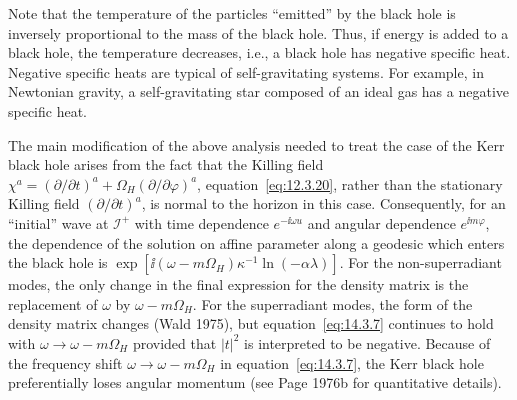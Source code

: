 Note that the temperature of the particles ``emitted'' by the black hole is inversely
proportional to the mass of the black hole. Thus, if energy is added to a black hole,
the temperature decreases, i.e., a black hole has negative specific heat. Negative
specific heats are typical of self-gravitating systems. For example, in Newtonian
gravity, a self-gravitating star composed of an ideal gas has a negative specific heat.

The main modification of the above analysis needed to treat the case of the Kerr
black hole arises from the fact that the Killing field
\(\chi^a=(\partial/\partial t)^a+\Omega_H(\partial/\partial\varphi)^a\),
equation~\eqref{eq:12.3.20}, rather than the stationary Killing field
\((\partial/\partial t)^a\), is normal to the horizon in this case. Consequently, for
an ``initial'' wave at \(\mathcal I^+\) with time dependence \(e^{-\ii\omega u}\)
and angular dependence \(e^{\ii m\varphi}\), the dependence of the solution on
affine parameter along a geodesic which enters the black hole is
\(\exp[\ii(\omega-m\Omega_H)\kappa^{-1}\ln(-\alpha\lambda)]\). For the
non-superradiant modes, the only change in the final expression for the density
matrix is the replacement of \(\omega\) by \(\omega-m\Omega_H\). For the
superradiant modes, the form of the density matrix changes (Wald 1975), but
equation~\eqref{eq:14.3.7} continues to hold with
\(\omega\longrightarrow\omega-m\Omega_H\) provided that \(|t|^2\) is
interpreted to be negative. Because of the frequency shift
\(\omega\longrightarrow\omega-m\Omega_H\) in equation~\eqref{eq:14.3.7}, the
Kerr black hole preferentially loses angular momentum (see Page 1976b for
quantitative details).

